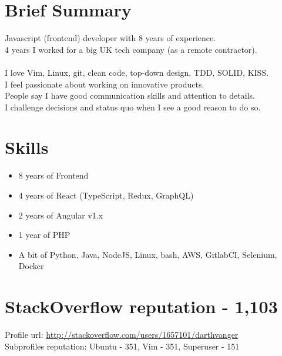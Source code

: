 \documentclass[a4paper, 14pt]{article}
\begin{document}
\begin{center}
	\textsc{\Huge{}}
\end{center}


\section{Brief Summary}
  Javascript (frontend) developer with 8 years of experience.  \\
  4 years I worked for a big UK tech company (as a remote contractor). \\
  \\
  I love Vim, Linux, git, clean code, top-down design, TDD, SOLID, KISS. \\
  I feel passionate about working on innovative products. \\
  People say I have good communication skills and attention to details. \\
  I challenge decisions and status quo when I see a good reason to do so.

\section{Skills}
  \begin{itemize}
    \item 8 years of Frontend  \\
    \item 4 years of React (TypeScript, Redux, GraphQL) \\
    \item 2 years of Angular v1.x \\ 
    \item 1 year of PHP \\
    \item A bit of Python, Java, NodeJS, Linux, bash, AWS, GitlabCI, Selenium, Docker
  \end{itemize}

\section{StackOverflow reputation - 1,103}
  Profile url: \url{http://stackoverflow.com/users/1657101/darthvanger} \\
  Subprofiles reputation: Ubuntu - 351, Vim - 351, Superuser - 151
\end{document}
